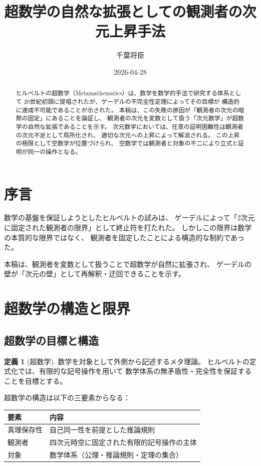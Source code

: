 \documentclass[11pt,a4paper]{article}
\theoremstyle{definition}
\newtheorem{definition}{定義}[section]
\begin{document}
\title{超数学の自然な拡張としての観測者の次元上昇手法}
\author{千葉将臣}
\date{2026-04-28}
\maketitle

\begin{abstract}
ヒルベルトの超数学（Metamathematics）は、数学を数学的手法で研究する体系として
20世紀初頭に提唱されたが、ゲーデルの不完全性定理によってその目標が
構造的に達成不可能であることが示された。
本稿は、この失敗の原因が「観測者の次元の暗黙の固定」にあることを論証し、
観測者の次元を変数として扱う「次元数学」が超数学の自然な拡張であることを示す。
次元数学においては、任意の証明困難性は観測者の次元不足として局所化され、
適切な次元への上昇によって解消される。
この上昇の極限として空数学が位置づけられ、
空数学では観測者と対象の不二により立式と証明が同一の操作となる。
\end{abstract}

\section*{序言}

数学の基盤を保証しようとしたヒルベルトの試みは、
ゲーデルによって「2次元に固定された観測者の限界」として終止符を打たれた。
しかしこの限界は数学の本質的な限界ではなく、
観測者を固定したことによる構造的な制約であった。

本稿は、観測者を変数として扱うことで超数学が自然に拡張され、
ゲーデルの壁が「次元の壁」として再解釈・迂回できることを示す。

\section{超数学の構造と限界}

\subsection{超数学の目標と構造}

\begin{definition}[超数学]
数学を対象として外側から記述するメタ理論。
ヒルベルトの定式化では、有限的な記号操作を用いて
数学体系の無矛盾性・完全性を保証することを目標とする。
\end{definition}

超数学の構造は以下の三要素からなる：

\begin{center}
\begin{tabular}{ll}
\toprule
要素 & 内容 \\
\midrule
真理保存性 & 自己同一性を前提とした推論規則 \\
観測者 & 四次元時空に固定された有限的記号操作の主体 \\
対象 & 数学体系（公理・推論規則・定理の集合） \\
\bottomrule
\end{tabular}
\end{center}
\end{document}
